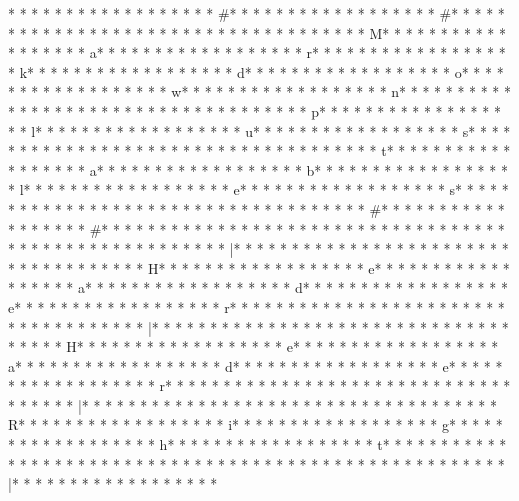* * *  * * *  * * *  *  * * *  *  * * *  * #* * *  * * *  * * *  *  * * *  *  * * *  * #* * *  * * *  * * *  *  * * *  *  * * *  *  * * *  * * *  * * *  *  * * *  *  * * *  * M* * *  * * *  * * *  *  * * *  *  * * *  * a* * *  * * *  * * *  *  * * *  *  * * *  * r* * *  * * *  * * *  *  * * *  *  * * *  * k* * *  * * *  * * *  *  * * *  *  * * *  * d* * *  * * *  * * *  *  * * *  *  * * *  * o* * *  * * *  * * *  *  * * *  *  * * *  * w* * *  * * *  * * *  *  * * *  *  * * *  * n* * *  * * *  * * *  *  * * *  *  * * *  *  * * *  * * *  * * *  *  * * *  *  * * *  * p* * *  * * *  * * *  *  * * *  *  * * *  * l* * *  * * *  * * *  *  * * *  *  * * *  * u* * *  * * *  * * *  *  * * *  *  * * *  * s* * *  * * *  * * *  *  * * *  *  * * *  *  * * *  * * *  * * *  *  * * *  *  * * *  * t* * *  * * *  * * *  *  * * *  *  * * *  * a* * *  * * *  * * *  *  * * *  *  * * *  * b* * *  * * *  * * *  *  * * *  *  * * *  * l* * *  * * *  * * *  *  * * *  *  * * *  * e* * *  * * *  * * *  *  * * *  *  * * *  * s* * *  * * *  * * *  *  * * *  *  * * *  *  * * *  * * *  * * *  *  * * *  *  * * *  * #* * *  * * *  * * *  *  * * *  *  * * *  * #* * *  * * *  * * *  *  * * *  *  * * *  * 
* * *  * * *  * * *  *  * * *  *  * * *  * 
* * *  * * *  * * *  *  * * *  *  * * *  * |* * *  * * *  * * *  *  * * *  *  * * *  *  * * *  * * *  * * *  *  * * *  *  * * *  * H* * *  * * *  * * *  *  * * *  *  * * *  * e* * *  * * *  * * *  *  * * *  *  * * *  * a* * *  * * *  * * *  *  * * *  *  * * *  * d* * *  * * *  * * *  *  * * *  *  * * *  * e* * *  * * *  * * *  *  * * *  *  * * *  * r* * *  * * *  * * *  *  * * *  *  * * *  *  * * *  * * *  * * *  *  * * *  *  * * *  * |* * *  * * *  * * *  *  * * *  *  * * *  *  * * *  * * *  * * *  *  * * *  *  * * *  * H* * *  * * *  * * *  *  * * *  *  * * *  * e* * *  * * *  * * *  *  * * *  *  * * *  * a* * *  * * *  * * *  *  * * *  *  * * *  * d* * *  * * *  * * *  *  * * *  *  * * *  * e* * *  * * *  * * *  *  * * *  *  * * *  * r* * *  * * *  * * *  *  * * *  *  * * *  *  * * *  * * *  * * *  *  * * *  *  * * *  * |* * *  * * *  * * *  *  * * *  *  * * *  *  * * *  * * *  * * *  *  * * *  *  * * *  * R* * *  * * *  * * *  *  * * *  *  * * *  * i* * *  * * *  * * *  *  * * *  *  * * *  * g* * *  * * *  * * *  *  * * *  *  * * *  * h* * *  * * *  * * *  *  * * *  *  * * *  * t* * *  * * *  * * *  *  * * *  *  * * *  *  * * *  * * *  * * *  *  * * *  *  * * *  *  * * *  * * *  * * *  *  * * *  *  * * *  * |* * *  * * *  * * *  *  * * *  *  * * *  * 
